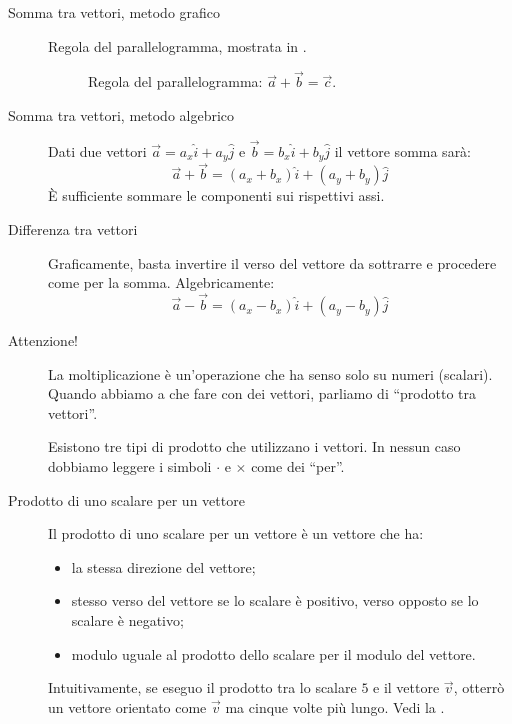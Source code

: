 \documentclass[a4paper,11pt,italian]{article}
\begin{document}
\begin{description}
  \item[Somma tra vettori, metodo grafico]
  Regola del parallelogramma, mostrata in .

\begin{figure}[htb]\centering
{}\caption{Regola del parallelogramma: $ \vec{a} + \vec{b} = \vec{c} $.}
\label{img:parallelogramma}
\end{figure}

  \item[Somma tra vettori, metodo algebrico]
  Dati due vettori $ \vec{a} = a_x \hat{i} + a_y \hat{j} $ e  $ \vec{b} = b_x \hat{i} + b_y \hat{j} $ il vettore somma sarà: 
  \[ \vec{a} + \vec{b} =  (a_x + b_x) \hat{i} + (a_y + b_y) \hat{j}  \]
  È sufficiente sommare le componenti sui rispettivi assi.
  
  \item[Differenza tra vettori]
  Graficamente, basta invertire il verso del vettore da sottrarre e procedere come per la somma. Algebricamente:
  \[ \vec{a} - \vec{b} =  (a_x - b_x) \hat{i} + (a_y - b_y) \hat{j} \]
  
  \item[Attenzione!]
  La moltiplicazione è un'operazione che ha senso solo su numeri (scalari). Quando abbiamo a che fare con dei vettori, parliamo di ``prodotto tra vettori''. 
  
  Esistono tre tipi di prodotto che utilizzano i vettori. In nessun caso dobbiamo leggere i simboli $ \cdot $ e $ \times $ come dei ``per''.
  
  \item[Prodotto di uno scalare per un vettore]
  Il prodotto di uno scalare per un vettore è un vettore che ha:
  \begin{itemize}
    \item la stessa direzione del vettore;
    \item stesso verso del vettore se lo scalare è positivo, verso opposto se lo scalare è negativo;
    \item modulo uguale al prodotto dello scalare per il modulo del vettore.
  \end{itemize}
  Intuitivamente, se eseguo il prodotto tra lo scalare $ 5 $ e il vettore $ \vec{v} $, otterrò un vettore orientato come $ \vec{v} $ ma cinque volte più lungo. Vedi la .
  

\end{description}
\end{document}
